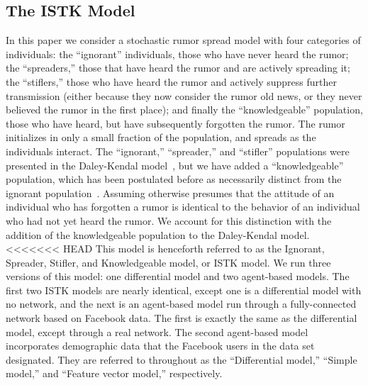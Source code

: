 \subsection{The ISTK Model}
\label{subsec:istk}

In this paper we consider a stochastic rumor spread model with four categories of individuals: the ``ignorant'' individuals, those who have never heard the rumor; the ``spreaders,'' those that have heard the rumor and are actively spreading it; the ``stiflers,'' those who have heard the rumor and actively suppress further transmission (either because they now consider the rumor old news, or they never believed the rumor in the first place); and finally the ``knowledgeable'' population, those who have heard, but have subsequently forgotten the rumor.
The rumor initializes in only a small fraction of the population, and spreads as the individuals interact.
The ``ignorant,'' ``spreader,'' and ``stifler'' populations were presented in the Daley-Kendal model~\cite{daley-1965}, but we have added a ``knowledgeable'' population, which has been postulated before as necessarily distinct from the ignorant population~\cite{zhao-2012, zhao-2011}.
Assuming otherwise presumes that the attitude of an individual who has forgotten a rumor is identical to the behavior of an individual who had not yet heard the rumor.
We account for this distinction with the addition of the knowledgeable population to the Daley-Kendal model.
<<<<<<< HEAD
This model is henceforth referred to as the Ignorant, Spreader, Stifler, and Knowledgeable model, or ISTK model.
We run three versions of this model: one differential model and two agent-based models.
The first two ISTK models are nearly identical, except one is a differential model with no network, and the next is an agent-based model run through a fully-connected network based on Facebook data.
The first is exactly the same as the differential model, except through a real network.
The second agent-based model incorporates demographic data that the Facebook users in the data set designated.
They are referred to throughout as the ``Differential model,''  ``Simple model,'' and ``Feature vector model,'' respectively.

